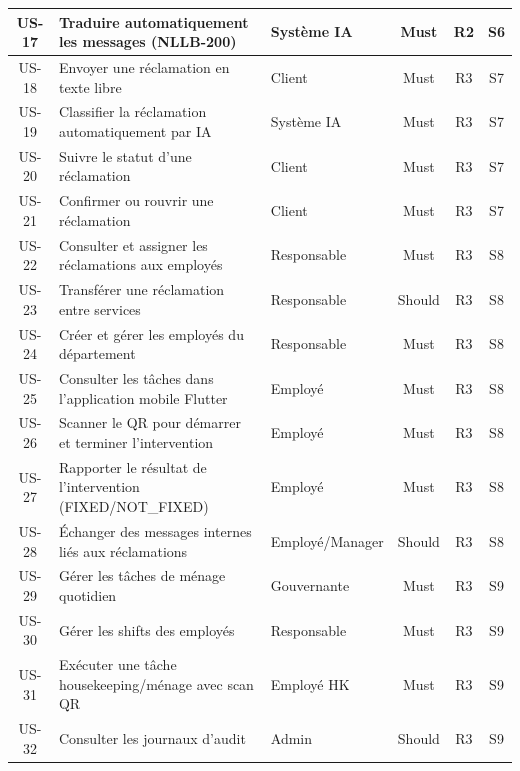 \begin{longtable}{|c|p{7.8cm}|p{2.4cm}|c|c|c|}
US-17 & Traduire automatiquement les messages (NLLB-200) & Système IA & Must & R2 & S6 \\ \hline
US-18 & Envoyer une réclamation en texte libre & Client & Must & R3 & S7 \\ \hline
US-19 & Classifier la réclamation automatiquement par IA & Système IA & Must & R3 & S7 \\ \hline
US-20 & Suivre le statut d'une réclamation & Client & Must & R3 & S7 \\ \hline
US-21 & Confirmer ou rouvrir une réclamation & Client & Must & R3 & S7 \\ \hline
US-22 & Consulter et assigner les réclamations aux employés & Responsable & Must & R3 & S8 \\ \hline
US-23 & Transférer une réclamation entre services & Responsable & Should & R3 & S8 \\ \hline
US-24 & Créer et gérer les employés du département & Responsable & Must & R3 & S8 \\ \hline
US-25 & Consulter les tâches dans l'application mobile Flutter & Employé & Must & R3 & S8 \\ \hline
US-26 & Scanner le QR pour démarrer et terminer l'intervention & Employé & Must & R3 & S8 \\ \hline
US-27 & Rapporter le résultat de l'intervention (FIXED/NOT\_FIXED) & Employé & Must & R3 & S8 \\ \hline
US-28 & Échanger des messages internes liés aux réclamations & Employé/Manager & Should & R3 & S8 \\ \hline
US-29 & Gérer les tâches de ménage quotidien & Gouvernante & Must & R3 & S9 \\ \hline
US-30 & Gérer les shifts des employés & Responsable & Must & R3 & S9 \\ \hline
US-31 & Exécuter une tâche housekeeping/ménage avec scan QR & Employé HK & Must & R3 & S9 \\ \hline
US-32 & Consulter les journaux d'audit & Admin & Should & R3 & S9 \\ \hline
\end{longtable}
